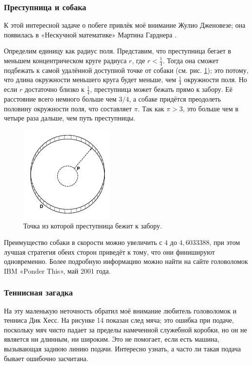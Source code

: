 \subsubsection*{Преступница и собака}

К этой интересной задаче о побеге привлёк моё внимание Жулио Дженовезе;
она появилась в «Нескучной математике» Мартина Гарднера \cite{gardner2008}.

Определим единицу как радиус поля.
Представим, что преступница бегает в меньшем концентрическом круге радиуса $r$, где $r < \tfrac14$.
Тогда она сможет подбежать к самой удалённой доступной точке от собаки (см. рис. \ref{pic:dog});
это потому, что длина окружности меньшего круга будет меньше, чем $\tfrac14$ окружности поля.
Но если $r$ достаточно близко к $\tfrac14$, преступница может бежать прямо к забору.
Её расстояние всего немного больше чем $3/4$, а собаке придётся преодолеть половину окружности поля, что составляет $\pi$.
Так как $\pi > 3$, это больше чем в четыре раза дальше, чем путь преступницы.

\begin{figure}[h!]
\centering
\includegraphics[scale=1]{pics/dog}
\caption{Точка из которой преступница бежит к забору.}
\label{pic:dog}
\end{figure}

Преимущество собаки в скорости можно увеличить с $4$ до $4{,}6033388$, при этом лучшая стратегия обеих сторон приведёт к тому, что они финишируют одновременно.
Более подробную информацию можно найти на сайте головоломок IBM «Ponder This», май 2001 года.

\subsubsection*{Теннисная загадка}

На эту маленькую неточность обратил моё внимание любитель головоломок и тенниса Дик Хесс.
На рисунке 14 показан след мяча; это ошибка при подаче, поскольку мяч чисто падает за пределы намеченной служебной коробки, но он не является ни длинным, ни широким.
Это не помогает, если есть машина, вызывающая заднюю линию подачи.
Интересно узнать, а часто ли такая подача бывает ошибочно засчитана.

